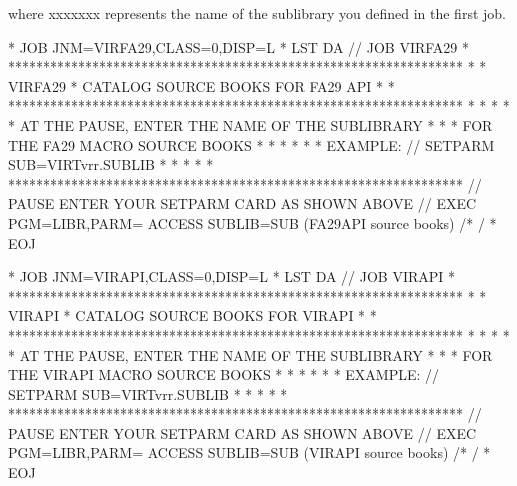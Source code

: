 \documentclass[letterpaper,10pt,english]{sphinxmanual}
\begin{document}
\begin{sphinxVerbatim}[commandchars=\\\{\}]
  
\end{sphinxVerbatim}

where  xxxxxxx represents the name of the sublibrary you defined in the first job.

\begin{sphinxVerbatim}[commandchars=\\\{\}]
* \PYGZdl{}\PYGZdl{} JOB JNM=VIRFA29,CLASS=0,DISP=L
* \PYGZdl{}\PYGZdl{} LST DA
// JOB VIRFA29
* *****************************************************************
* * VIRFA29 * CATALOG SOURCE BOOKS FOR FA29 API                   *
* *****************************************************************
* *                                                               *
* * AT THE PAUSE, ENTER THE NAME OF THE SUB\PYGZhy{}LIBRARY               *
* * FOR THE FA29 MACRO SOURCE BOOKS                               *
* *                                                               *
* * EXAMPLE: // SETPARM SUB=\PYGZsq{}VIRTvrr.SUBLIB\PYGZsq{}                      *
* *                                                               *
* *****************************************************************
// PAUSE ENTER YOUR SETPARM CARD AS SHOWN ABOVE
// EXEC PGM=LIBR,PARM=\PYGZsq{} ACCESS SUBLIB=\PYGZam{}SUB\PYGZsq{}
        (FA29API source books)
/*
/\PYGZam{}
* \PYGZdl{}\PYGZdl{} EOJ
\end{sphinxVerbatim}


\begin{sphinxVerbatim}[commandchars=\\\{\}]
* \PYGZdl{}\PYGZdl{} JOB JNM=VIRAPI,CLASS=0,DISP=L
* \PYGZdl{}\PYGZdl{} LST DA
// JOB VIRAPI
* *****************************************************************
* * VIRAPI * CATALOG SOURCE BOOKS FOR VIRAPI                      *
* *****************************************************************
* *                                                               *
* * AT THE PAUSE, ENTER THE NAME OF THE SUB\PYGZhy{}LIBRARY               *
* * FOR THE VIRAPI MACRO SOURCE BOOKS                             *
* *                                                               *
* * EXAMPLE: // SETPARM SUB=\PYGZsq{}VIRTvrr.SUBLIB\PYGZsq{}                      *
* *                                                               *
* *****************************************************************
// PAUSE ENTER YOUR SETPARM CARD AS SHOWN ABOVE
// EXEC PGM=LIBR,PARM=\PYGZsq{} ACCESS SUBLIB=\PYGZam{}SUB\PYGZsq{}
        (VIRAPI source books)
/*
/\PYGZam{}
* \PYGZdl{}\PYGZdl{} EOJ
\end{sphinxVerbatim}
\end{document}
